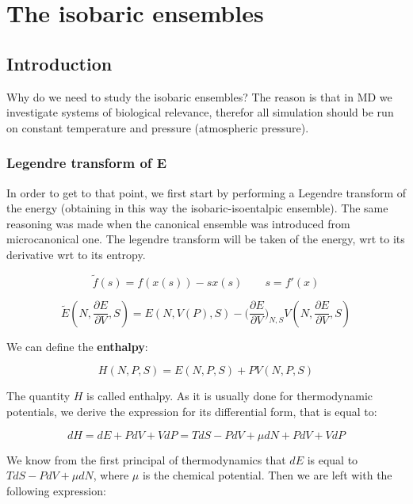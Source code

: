 \graphicspath{{chapters/12/images/}}
\chapter{The isobaric ensembles}

\section{Introduction}
Why do we need to study the isobaric ensembles? 
The reason is that in MD we investigate systems of biological relevance, therefor all simulation should be run on constant temperature and pressure (atmospheric pressure).
  
	\subsection{Legendre transform of E}
	In order to get to that point, we first start by performing a Legendre transform of the energy (obtaining in this way the isobaric-isoentalpic ensemble). 
	The same reasoning was made when the canonical ensemble was introduced from microcanonical one. 
	The legendre transform will be taken of the energy, wrt to its derivative wrt to its entropy. 

	$$\tilde{f}(s) = f(x(s))-sx(s)\qquad s = f'(x)$$

	$$\tilde{E}(N, \frac{\partial E}{\partial V}, S) = E(N, V(P), S) - \biggl(\frac{\partial E}{\partial V}\biggr)_{N, S}V(N, \frac{\partial E}{\partial V}, S)$$
	

	We can define the \textbf{enthalpy}:

	$$H(N, P, S) = E(N, P, S) + PV(N, P, S)$$
	
	The quantity $H$ is called enthalpy. As it is usually done for thermodynamic potentials, we derive the expression for its differential form, that is equal to:
	
	$$dH = dE + PdV + VdP = TdS - PdV + \mu dN + PdV + VdP$$
	
	We know from the first principal of thermodynamics that $dE$ is equal to $TdS - PdV + \mu dN$, where $\mu$ is the chemical potential. Then we are left with the following expression: 

